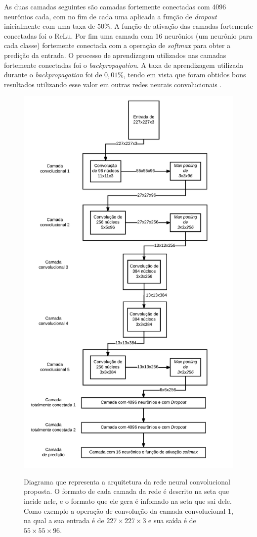 \par As duas camadas seguintes são camadas fortemente conectadas com 4096 neurônios cada, com no fim de cada uma aplicada a função de \textit{dropout} inicialmente com uma taxa de 50\%. A função de ativação das camadas fortemente conectadas foi o ReLu. Por fim uma camada com 16 neurônios (um neurônio para cada classe) fortemente conectada com a operação de \textit{softmax} para obter a predição da entrada. O processo de aprendizagem utilizados nas camadas fortemente conectadas foi o \textit{backpropagation}. A taxa de aprendizagem utilizada durante o \textit{backpropagation} foi de $0,01\%$, tendo em vista que foram obtidos bons resultados utilizando esse valor em outras redes neurais convolucionais \cite{imaginetArticle}.

\begin{figure}[H]
  \centering
  \caption{Diagrama que representa a arquitetura da rede neural convolucional proposta. O formato de cada camada da rede é descrito na seta que incide nele, e o formato que ele gera é infomado na seta que sai dele. Como exemplo a operação de convolução da camada convolucional 1, na qual a sua entrada é de $227\times227\times3$ e sua saída é de $55\times55\times96$.}
  \includegraphics[width=350pt]{dados/figuras/dia_rede}
  \label{fig:arqrede}
\end{figure}

